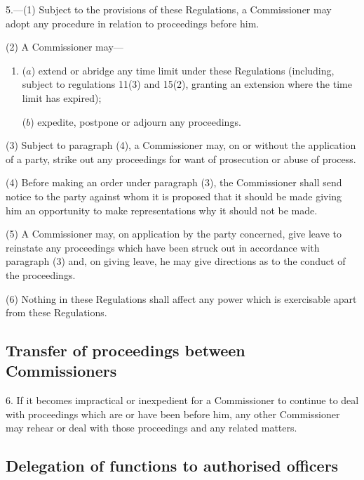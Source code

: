 \documentclass[12pt,a4paper]{article}
\begin{document}
5.—(1) Subject to the provisions of these Regulations, a Commissioner may adopt any procedure in relation to proceedings before him.

(2) A Commissioner may---
\begin{enumerate}\item[]
($a$) extend or abridge any time limit under these Regulations (including, subject to regulations 11(3) and 15(2), granting an extension where the time limit has expired);

($b$) expedite, postpone or adjourn any proceedings.
\end{enumerate}

(3) Subject to paragraph (4), a Commissioner may, on or without the application of a party, strike out any proceedings for want of prosecution or abuse of process.

(4) Before making an order under paragraph (3), the Commissioner shall send notice to the party against whom it is proposed that it should be made giving him an opportunity to make representations why it should not be made.

(5) A Commissioner may, on application by the party concerned, give leave to reinstate any proceedings which have been struck out in accordance with paragraph (3) and, on giving leave, he may give directions as to the conduct of the proceedings.

(6) Nothing in these Regulations shall affect any power which is exercisable apart from these Regulations.

\subsection[6. Transfer of proceedings between Commissioners]{Transfer of proceedings between Commissioners}

6.  If it becomes impractical or inexpedient for a Commissioner to continue to deal with proceedings which are or have been before him, any other Commissioner may rehear or deal with those proceedings and any related matters.

\subsection[7. Delegation of functions to authorised officers]{Delegation of functions to authorised officers}
\end{document}
